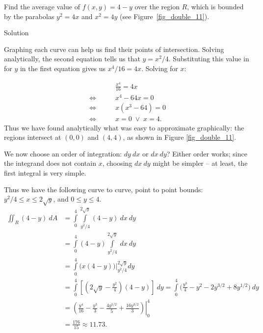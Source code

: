 \begin{example}\label{ex_double8}
Find the average value of $f(x,y) = 4-y$ over the region $R$, which is bounded by the parabolas $y^2=4x$ and $x^2=4y$ (see Figure~\ref{fig_double_11}). 




Solution 

Graphing each curve can help us find their points of intersection. Solving analytically, the second equation tells us that $y=x^2/4$. Substituting this value in for $y$ in the first equation gives us $x^4/16 = 4x$. Solving for $x$:

\allowdisplaybreaks
\begin{align*}
& \qquad \frac{x^4}{16} = 4x\\
\Leftrightarrow & \qquad x^4-64x = 0\\
\Leftrightarrow & \qquad x(x^3-64)  = 0\\
\Leftrightarrow & \qquad x = 0 \;  \vee \;  x = 4.
\end{align*}
Thus we have found analytically what was easy to approximate graphically: the regions intersect at $(0,0)$ and $(4,4)$, as shown in Figure \ref{fig_double_11}. 



We now choose an order of integration: $dy\ dx$ or $dx\ dy$? Either order works; since the integrand does not contain $x$, choosing $dx\ dy$ might be simpler -- at least, the first integral is very simple.

Thus we have the following curve to curve, point to point bounds: $y^2/4\leq x\leq 2\sqrt y$, and $0\leq y\leq 4$. 
\begin{align*}
\iint_R (4-y)\ dA &= \int\limits_0^4\int\limits_{y^2/4}^{2\sqrt{y}}(4-y)\ dx\ dy\\
&= \int\limits_0^4(4-y)\int\limits_{y^2/4}^{2\sqrt{y}}\ dx\ dy\\
				&= \int\limits_0^4 \big(x(4-y)\big)\Big|_{y^2/4}^{2\sqrt{y}} dy\\
				&= \int\limits_0^4 \left[\left(2\sqrt{y}-\frac{y^2}{4}\right)(4-y)\right]\ dy = \int\limits_0^4 \Big( \frac{y^3}{4}-y^2-2y^{3/2}+8y^{1/2}\Big)\ dy\\
				&= \left.\left(\frac{y^4}{16}-\frac{y^3}{3}-\frac{4y^{5/2}}5+\frac{16y^{3/2}}3\right)\right|_0^4\\
				&= \frac{176}{15} \approx 11.73.
\end{align*}




\end{example}
